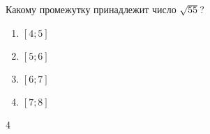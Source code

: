 \begin{ex}
	Какому промежутку принадлежит число $\sqrt{55}$?
	
	\selectanswer
	\begin{multicols}{4}
		\begin{enumerate}[label=\arabic*)]
			\item $[4;5]$
			\item $[5;6]$
			\item $[6;7]$
			\item $[7;8]$
		\end{enumerate}
	\end{multicols}
	\begin{answer}
		4
	\end{answer}
\end{ex}